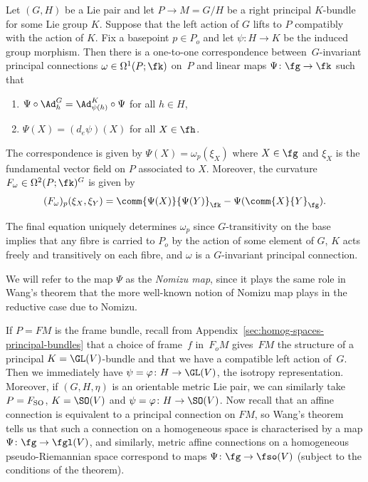 \begin{Theorem}\label{thm:Wang}
	Let $(G,H)$ be a Lie pair and let $P\to M=G/H$ be a right principal $K$-bundle for some Lie group $K$. Suppose that the left action of $G$ lifts to $P$ compatibly with the action of $K$. Fix a basepoint $p\in P_o$ and let $\psi\colon H\to K$ be the induced group morphism. Then there is a one-to-one correspondence between~$G$-invariant principal connections $\omega\in\Omega^1(P;\fk)$ on~$P$ and linear maps $\Psi\colon \fg\to\fk$ such that
	\begin{enumerate}\itemsep=0pt
		\item[$(1)$] $\Psi\circ\Ad^G_h = \Ad^K_{\psi(h)}\circ\Psi$ for all $h\in H$,
		\item[$(2)$] $\Psi(X)=(d_e\psi)(X)$ for all $X\in\fh$.
	\end{enumerate}
	The correspondence is given by
$\Psi(X) = \omega_p(\xi_X)
$
	where $X\in \fg$ and $\xi_X$ is the fundamental vector field on $P$ associated to $X$. Moreover, the curvature $F_\omega\in\Omega^2(P;\fk)^G$ is given by
	\[
(F_\omega)_p(\xi_X,\xi_Y) = \comm{\Psi(X)}{\Psi(Y)}_\fk - \Psi(\comm{X}{Y}_\fg).
	\]
\end{Theorem}

The final equation uniquely determines $\omega_p$ since $G$-transitivity on the base implies that any fibre is carried to $P_o$ by the action of some element of $G$, $K$ acts freely and transitively on each fibre, and $\omega$ is a $G$-invariant principal connection.

We will refer to the map $\Psi$ as the \emph{Nomizu map}, since it plays the same role in Wang's theorem that the more well-known notion of Nomizu map plays in the reductive case due to Nomizu.

If $P=FM$ is the frame bundle, recall from Appendix~\ref{sec:homog-spaces-principal-bundles} that a choice of frame~$f$ in~$F_oM$ gives~$FM$ the structure of a principal $K=\GL(V)$-bundle and that we have a compatible left action of~$G$. Then we immediately have $\psi=\varphi\colon H\to\GL(V)$, the isotropy representation. Moreover, if $(G,H,\eta)$ is an orientable metric Lie pair, we can similarly take $P=F_{\rm SO}$, ${K=\SO(V)}$ and $\psi=\varphi\colon H\to\SO(V)$. Now recall that an affine connection is equivalent to a principal connection on $FM$, so Wang's theorem tells us that such a connection on a homogeneous space is characterised by a map $\Psi\colon \fg\to\fgl(V)$, and similarly, metric affine connections on a homogeneous pseudo-Riemannian space correspond to maps $\Psi\colon \fg\to\fso(V)$ (subject to the conditions of the theorem).

